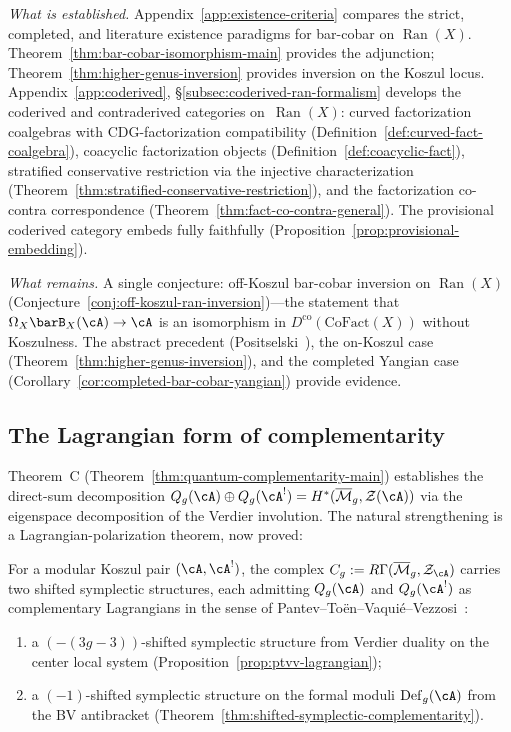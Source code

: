 \emph{What is established.}
Appendix~\ref{app:existence-criteria} compares the strict,
completed, and literature existence paradigms for bar-cobar on
$\operatorname{Ran}(X)$.  Theorem~\ref{thm:bar-cobar-isomorphism-main}
provides the adjunction; Theorem~\ref{thm:higher-genus-inversion}
provides inversion on the Koszul locus.
Appendix~\ref{app:coderived},
\S\ref{subsec:coderived-ran-formalism} develops the coderived
and contraderived categories on~$\operatorname{Ran}(X)$: curved
factorization coalgebras with CDG-factorization compatibility
(Definition~\ref{def:curved-fact-coalgebra}), coacyclic
factorization objects
(Definition~\ref{def:coacyclic-fact}), stratified conservative
restriction via the injective characterization
(Theorem~\ref{thm:stratified-conservative-restriction}),
and the factorization co-contra correspondence
(Theorem~\ref{thm:fact-co-contra-general}).  The provisional
coderived category embeds fully faithfully
(Proposition~\ref{prop:provisional-embedding}).

\emph{What remains.}
A single conjecture: off-Koszul bar-cobar inversion on
$\operatorname{Ran}(X)$
(Conjecture~\ref{conj:off-koszul-ran-inversion})---the statement
that $\Omega_X \barB_X(\cA) \to \cA$ is an isomorphism in
$D^{\mathrm{co}}(\mathrm{CoFact}(X))$ without Koszulness.  The
abstract precedent (Positselski~\cite[Theorem~7.2]{Positselski11}),
the on-Koszul case (Theorem~\ref{thm:higher-genus-inversion}), and
the completed Yangian case
(Corollary~\ref{cor:completed-bar-cobar-yangian}) provide evidence.

\subsection{The Lagrangian form of complementarity}

Theorem~C (Theorem~\ref{thm:quantum-complementarity-main}) establishes
the direct-sum decomposition
$Q_g(\cA) \oplus Q_g(\cA^!)
= H^*(\overline{\mathcal{M}}_g, \mathcal{Z}(\cA))$
via the eigenspace decomposition of the Verdier involution.
The natural strengthening is a Lagrangian-polarization theorem,
now proved:

\begin{theorem}\label{thm:lagrangian-complementarity}
For a modular Koszul pair $(\cA, \cA^!)$,
the complex
$C_g := R\Gamma(\overline{\mathcal{M}}_g, \mathcal{Z}_{\cA})$
carries two shifted symplectic structures, each admitting
$Q_g(\cA)$ and $Q_g(\cA^!)$ as complementary Lagrangians in the
sense of Pantev--To\"en--Vaqui\'e--Vezzosi~\cite{PTVV13}:
\begin{enumerate}[label=\textup{(\roman*)}]
\item a $(-(3g{-}3))$-shifted symplectic structure from
  Verdier duality on the center local system
  \textup{(}Proposition~\textup{\ref{prop:ptvv-lagrangian}}\textup{)};
\item a $(-1)$-shifted symplectic structure on the formal moduli
  $\mathrm{Def}_g(\cA)$ from the BV antibracket
  \textup{(}Theorem~\textup{\ref{thm:shifted-symplectic-complementarity}}\textup{)}.
\end{enumerate}
\end{theorem}

